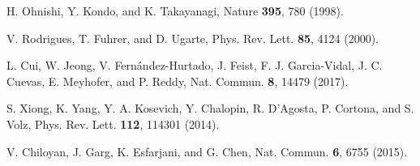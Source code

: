 \documentclass[aps,amsmath,amssymb,twocolumn,showpacs]{revtex4-1}
\begin{document}
\begin{thebibliography}{00}
H. Ohnishi, Y. Kondo, and K. Takayanagi,
Nature {\bf 395}, 780 (1998).

V. Rodrigues, T. Fuhrer, and D. Ugarte,
Phys. Rev. Lett. {\bf 85}, 4124 (2000).

L. Cui, W. Jeong, V. Fern\'andez-Hurtado, J. Feist, F. J. Garcia-Vidal,
J. C. Cuevas, E. Meyhofer, and P. Reddy, Nat. Commun. {\bf 8}, 14479 (2017).

S. Xiong, K. Yang, Y. A. Kosevich, Y. Chalopin, R. D'Agosta,
P. Cortona, and S. Volz, Phys. Rev. Lett. {\bf 112}, 114301 (2014).

V. Chiloyan, J. Garg, K. Esfarjani, and G. Chen, Nat. Commun. {\bf 6}, 6755
(2015). 

\end{thebibliography}
\end{document}
